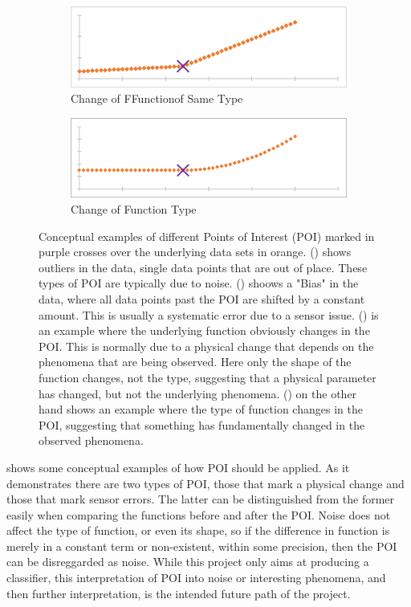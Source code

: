 \documentclass[main.tex]{subfiles}
\begin{document}
\begin{figure}[h]
      \begin{subfigure}{0.48\linewidth}
        \centering
        \includegraphics[width=0.9\linewidth]{figures/linearPOI}
        \caption{Change of FFunctionof Same Type}
        \label{fig:poi:linear}
      \end{subfigure}
      \begin{subfigure}{0.48\linewidth}
        \centering
        \includegraphics[width=0.9\linewidth]{figures/linSquPOI}
        \caption{Change of Function Type}
        \label{fig:poi:linSqu}
      \end{subfigure}
      \caption{Conceptual examples of different Points of Interest (POI) marked in purple crosses over the underlying data sets in orange. () shows outliers in the data, single data points that are out of place. These types of POI are typically due to noise. () shoows a "Bias" in the data, where all data points past the POI are shifted by a constant amount. This is usually a systematic error due to a sensor issue. () is an example where the underlying function obviously changes in the POI. This is normally due to a physical change that depends on the phenomena that are being observed. Here only the shape of the function changes, not the type, suggesting that a physical parameter has changed, but not the underlying phenomena. () on the other hand shows an example where the type of function changes in the POI, suggesting that something has fundamentally changed in the observed phenomena.}
      \label{fig:poi}
    \end{figure}
    
     shows some conceptual examples of how POI should be applied. As it demonstrates there are two types of POI, those that mark a physical change and those that mark sensor errors. The latter can be distinguished from the former easily when comparing the functions before and after the POI. Noise does not affect the type of function, or even its shape, so if the difference in function is merely in a constant term or non-existent, within some precision, then the POI can be disreggarded as noise. While this project only aims at producing a classifier, this interpretation of POI into noise or interesting phenomena, and then further interpretation, is the intended future path of the project.
    
\end{document}
